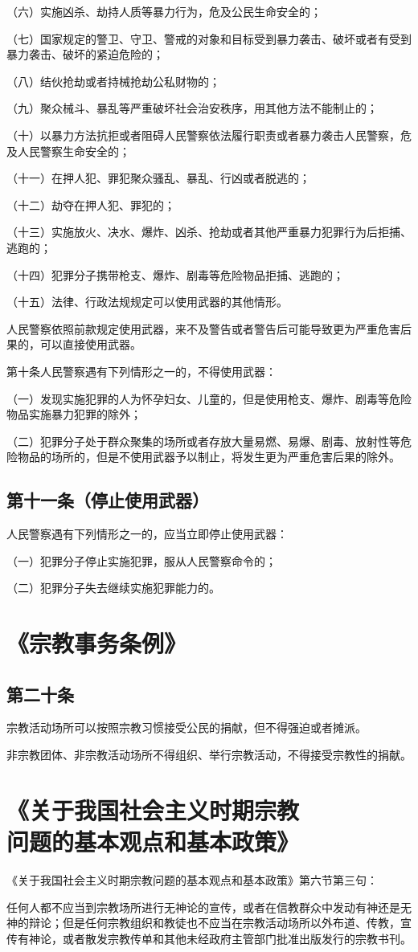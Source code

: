 \documentclass[utf-8,10pt]{ctexart}
\begin{document}
（六）实施凶杀、劫持人质等暴力行为，危及公民生命安全的；

（七）国家规定的警卫、守卫、警戒的对象和目标受到暴力袭击、破坏或者有受到暴力袭击、破坏的紧迫危险的；

（八）结伙抢劫或者持械抢劫公私财物的；

（九）聚众械斗、暴乱等严重破坏社会治安秩序，用其他方法不能制止的；

（十）以暴力方法抗拒或者阻碍人民警察依法履行职责或者暴力袭击人民警察，危及人民警察生命安全的；

（十一）在押人犯、罪犯聚众骚乱、暴乱、行凶或者脱逃的；

（十二）劫夺在押人犯、罪犯的；

（十三）实施放火、决水、爆炸、凶杀、抢劫或者其他严重暴力犯罪行为后拒捕、逃跑的；

（十四）犯罪分子携带枪支、爆炸、剧毒等危险物品拒捕、逃跑的；

（十五）法律、行政法规规定可以使用武器的其他情形。

人民警察依照前款规定使用武器，来不及警告或者警告后可能导致更为严重危害后果的，可以直接使用武器。

第十条人民警察遇有下列情形之一的，不得使用武器：

（一）发现实施犯罪的人为怀孕妇女、儿童的，但是使用枪支、爆炸、剧毒等危险物品实施暴力犯罪的除外；

（二）犯罪分子处于群众聚集的场所或者存放大量易燃、易爆、剧毒、放射性等危险物品的场所的，但是不使用武器予以制止，将发生更为严重危害后果的除外。
\subsection{第十一条（停止使用武器）}
人民警察遇有下列情形之一的，应当立即停止使用武器：

（一）犯罪分子停止实施犯罪，服从人民警察命令的；

（二）犯罪分子失去继续实施犯罪能力的。
\section{《宗教事务条例》}
\subsection{第二十条}
宗教活动场所可以按照宗教习惯接受公民的捐献，但不得强迫或者摊派。

非宗教团体、非宗教活动场所不得组织、举行宗教活动，不得接受宗教性的捐献。
\section{《关于我国社会主义时期宗教\\问题的基本观点和基本政策》}
\noindent 《关于我国社会主义时期宗教问题的基本观点和基本政策》第六节第三句：

任何人都不应当到宗教场所进行无神论的宣传，或者在信教群众中发动有神还是无神的辩论；但是任何宗教组织和教徒也不应当在宗教活动场所以外布道、传教，宣传有神论，或者散发宗教传单和其他未经政府主管部门批准出版发行的宗教书刊。
\end{document}
